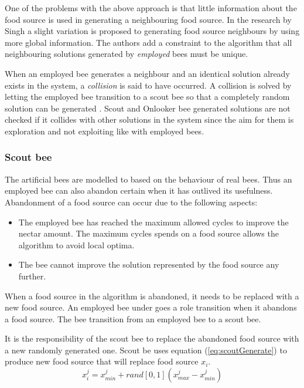One of the problems with the above approach is that little information about the food source is used in generating a neighbouring food source. In the research by Singh \cite{ABCLeafConstrained} a slight variation is proposed to generating food source neighbours by using more global information. The authors add a constraint to the algorithm that all neighbouring solutions generated by \emph{employed} bees must be unique. 

When an employed bee generates a neighbour and an identical solution already exists in the system, a \emph{collision} is said to have occurred. A collision is solved by letting the employed bee transition to a scout bee so that a completely random solution can be generated \cite{ABCLeafConstrained}. Scout and Onlooker bee generated solutions are not checked if it collides with other solutions in the system since the aim for them is exploration and not exploiting like with employed bees\cite{BeeJobShop,ABCCompareStudy}. 
\subsubsection{Scout bee}
The artificial bees are modelled to based on the behaviour of real bees. Thus an employed bee can also abandon certain when it has outlived its usefulness. Abandonment of a food source can occur due to the following aspects\cite{BeeJobShop,ABCNumericalOptimization,ABCImageEnhancement}:
\begin{itemize}
\item The employed bee has reached the maximum allowed cycles to improve the nectar amount. The maximum cycles spends on a food source allows the algorithm to avoid local optima\cite{ABCCompareStudy,ABCNumericalOptimization,ABCImageEnhancement}.
\item The bee cannot improve the solution represented by the food source any further\cite{ABCCompareStudy,ABCNumericalOptimization,ABCImageEnhancement}.
\end{itemize}
When a food source in the algorithm is abandoned, it needs to be replaced with a new food source\cite{BeeJobShop,ABCCompareStudy,ABCImageEnhancement}. An employed bee under goes a role transition when it abandons a food source. The bee transition from an employed bee to a scout bee\cite{ABCCompareStudy,ABCNumericalOptimization,ABCImageEnhancement}. 

It is the responsibility of the scout bee to replace the abandoned food source with a new randomly generated one\cite{BeeJobShop,ABCCompareStudy,ABCImageEnhancement}. Scout be uses equation (\ref{eq:scoutGenerate}) to produce new food source that will replace food source $x_i$.
\begin{equation}
\label{eq:scoutGenerate}
x^j_i = x^j_{min} + rand[0,1](x^j_{max} - x^j_{min})
\end{equation}

